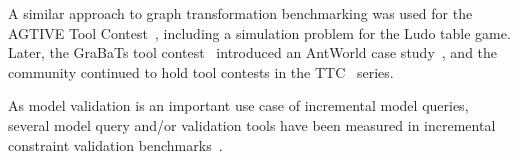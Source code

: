 A similar approach to graph transformation benchmarking was used for the AGTIVE Tool Contest~\cite{AGTIVEToolContest}, including a simulation problem for the Ludo table game. %
Later, the GraBaTs tool contest~\cite{GraBaTs08Contest} introduced an AntWorld case study~\cite{zuendorf08antworldcase}, %
and the community continued to hold tool contests in the TTC~\cite{TTC} series.

As model validation is an important use case of incremental model queries, several model query and/or validation tools have been measured in incremental constraint validation benchmarks~\cite{Egyed-incConsistency,falleri-praxis,models10}. 
